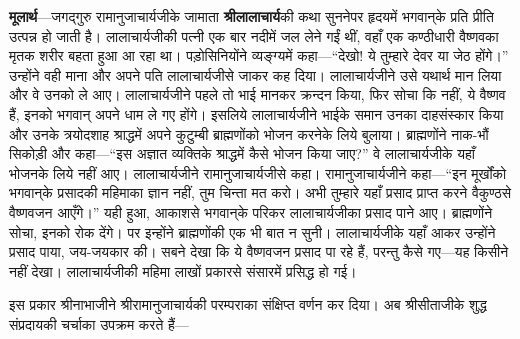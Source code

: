 \begin{sloppypar}\justifying{}
\textbf{मूलार्थ}—जगद्गुरु रामानुजाचार्यजीके जामाता \textbf{श्रीलालाचार्य}की कथा सुननेपर हृदयमें भगवान्‌के प्रति प्रीति उत्पन्न हो जाती है। लालाचार्यजीकी पत्नी एक बार नदीमें जल लेने गईं थीं, वहाँ एक कण्ठीधारी वैष्णवका मृतक शरीर बहता हुआ आ रहा था। पड़ोसिनियोंने व्यङ्ग्यमें कहा—“देखो! ये तुम्हारे देवर या जेठ होंगे।” उन्होंने वही माना और अपने पति लालाचार्यजीसे जाकर कह दिया। लालाचार्यजीने उसे यथार्थ मान लिया और वे उनको ले आए। लालाचार्यजीने पहले तो भाई मानकर क्रन्दन किया, फिर सोचा कि नहीं, ये वैष्णव हैं, इनको भगवान् अपने धाम ले गए होंगे। इसलिये लालाचार्यजीने भाईके समान उनका दाह\-संस्कार किया और उनके त्रयोदशाह श्राद्धमें अपने कुटुम्बी ब्राह्मणोंको भोजन करनेके लिये बुलाया। ब्राह्मणोंने नाक-भौं सिकोड़ी और कहा—“इस अज्ञात व्यक्तिके श्राद्धमें कैसे भोजन किया जाए?” वे लालाचार्यजीके यहाँ भोजनके लिये नहीं आए। लालाचार्यजीने रामानुजाचार्यजीसे कहा। रामानुजाचार्यजीने कहा—“इन मूर्खोंको भगवान्‌के प्रसादकी महिमाका ज्ञान नहीं, तुम चिन्ता मत करो। अभी तुम्हारे यहाँ प्रसाद प्राप्त करने वैकुण्ठसे वैष्णवजन आएँगे।” यही हुआ, आकाशसे भगवान्‌के परिकर लालाचार्यजीका प्रसाद पाने आए। ब्राह्मणोंने सोचा, इनको रोक देंगे। पर इन्होंने ब्राह्मणोंकी एक भी बात न सुनी। लालाचार्यजीके यहाँ आकर उन्होंने प्रसाद पाया, जय-जयकार की। सबने देखा कि ये वैष्णवजन प्रसाद पा रहे हैं, परन्तु कैसे गए—यह किसीने नहीं देखा। लालाचार्यजीकी महिमा लाखों प्रकारसे संसारमें प्रसिद्ध हो गई।
\end{sloppypar}
\begin{sloppypar}\justifying{}
इस प्रकार श्रीनाभाजीने श्रीरामानुजाचार्यकी परम्पराका संक्षिप्त वर्णन कर दिया। अब श्रीसीताजीके शुद्ध संप्रदायकी चर्चाका उपक्रम करते हैं—
\end{sloppypar}


